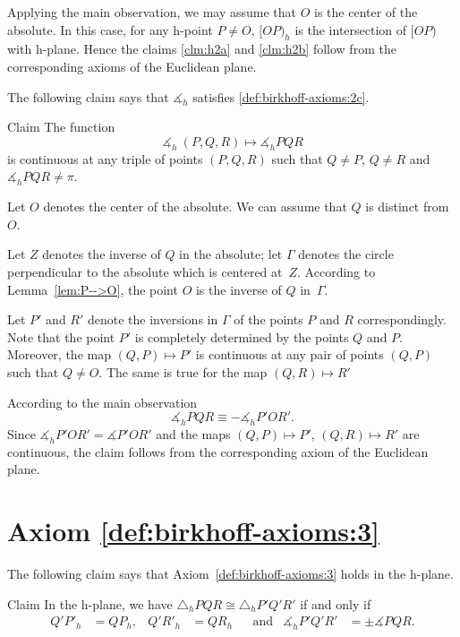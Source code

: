 Applying the main observation, 
we may assume that $O$ is the center of the absolute.
In this case, for any h-point $P\ne O$,
$[OP)_h$ is the intersection of $[OP)$ with h-plane.
Hence the claims \ref{clm:h2a} and \ref{clm:h2b} 
follow from the corresponding axioms of the Euclidean plane.
\qeds

The following claim says that
$\measuredangle_h$ satisfies
 \ref{def:birkhoff-axioms:2c}.

\begin{thm}{Claim}\label{clm:h2c}
The function 
$$\measuredangle_h\:(P,Q,R)\mapsto\measuredangle_h P Q R$$
is continuous at any triple of points $(P,Q,R)$
such that $Q\ne P$, $Q\ne R$ and $\measuredangle_h P Q R\ne\pi$.
\end{thm}

Let $O$ denotes the center of the absolute.
We can assume that $Q$ is distinct from~$O$.

Let $Z$ denotes the inverse of $Q$ in the absolute;
let $\Gamma$ denotes the circle perpendicular to the absolute which is centered at~$Z$.
According to Lemma~\ref{lem:P-->O},
the point $O$ is the inverse of $Q$ in~$\Gamma$.

Let $P'$ and $R'$ denote the inversions in $\Gamma$ of the points $P$ and $R$ correspondingly.
Note that the point $P'$ is completely determined by the points $Q$ and $P$.
Moreover, the map $(Q,P)\mapsto P'$ is continuous at any pair of points $(Q,P)$ such that $Q\ne O$.
The same is true for the map $(Q,R)\mapsto R'$

According to the main observation 
$$\measuredangle_h P Q R\equiv -\measuredangle_h P' O R'.$$
Since $\measuredangle_h P' O R'=\measuredangle P' O R'$ and 
the maps $(Q,P)\mapsto P'$, $(Q,R)\mapsto R'$ are continuous,
the claim follows from the corresponding axiom of the Euclidean plane.
\qeds

\section*{Axiom \ref{def:birkhoff-axioms:3}}

The following claim says that Axiom~\ref{def:birkhoff-axioms:3} holds in the h-plane.

\begin{thm}{Claim}
In the h-plane, we have
$\triangle_h P Q R 
\cong
\triangle_h P' Q' R'$
if and only if 
\begin{align*}
Q' P'_h&=Q P_h, & Q' R'_h&= Q R_h &&\text{and}
&\measuredangle_h P' Q' R'&=\pm\measuredangle P Q R.
\end{align*}
 
\end{thm}


